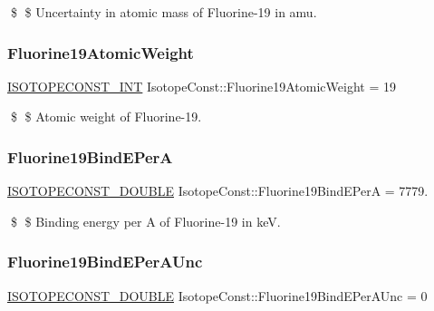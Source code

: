 \$ \$ Uncertainty in atomic mass of Fluorine-\/19 in amu. \mbox{\label{group___isotope_const-_fluorine-_f19_ga713791019daa40d27f91c1863bca69aa}} 
\subsubsection{\texorpdfstring{Fluorine19\+Atomic\+Weight}{Fluorine19AtomicWeight}}
{\footnotesize\ttfamily \mbox{\hyperlink{group___isotope_const-_macros_ga5f18360b3e99483a35c32d789e62621c}{I\+S\+O\+T\+O\+P\+E\+C\+O\+N\+S\+T\+\_\+\+I\+NT}} Isotope\+Const\+::\+Fluorine19\+Atomic\+Weight = 19}

\$ \$ Atomic weight of Fluorine-\/19. \mbox{\label{group___isotope_const-_fluorine-_f19_ga2725e9b3bf29a0ba1bf872d1e5b20fbe}} 
\subsubsection{\texorpdfstring{Fluorine19\+Bind\+E\+PerA}{Fluorine19BindEPerA}}
{\footnotesize\ttfamily \mbox{\hyperlink{group___isotope_const-_macros_ga8f45a7272ce02c0b4c65c44636ed719a}{I\+S\+O\+T\+O\+P\+E\+C\+O\+N\+S\+T\+\_\+\+D\+O\+U\+B\+LE}} Isotope\+Const\+::\+Fluorine19\+Bind\+E\+PerA = 7779.}

\$ \$ Binding energy per A of Fluorine-\/19 in keV. \mbox{\label{group___isotope_const-_fluorine-_f19_ga10f29b7ec7b3e4ebea866bf5b4d02bd8}} 
\subsubsection{\texorpdfstring{Fluorine19\+Bind\+E\+Per\+A\+Unc}{Fluorine19BindEPerAUnc}}
{\footnotesize\ttfamily \mbox{\hyperlink{group___isotope_const-_macros_ga8f45a7272ce02c0b4c65c44636ed719a}{I\+S\+O\+T\+O\+P\+E\+C\+O\+N\+S\+T\+\_\+\+D\+O\+U\+B\+LE}} Isotope\+Const\+::\+Fluorine19\+Bind\+E\+Per\+A\+Unc = 0}

